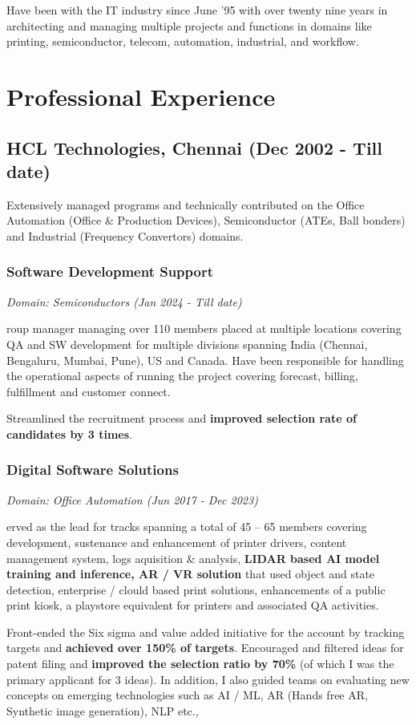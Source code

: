 \documentclass[a4paper,12pt]{article}
\newcommand\cvsubsection[3]{\subsection*{#1 \quad \small{(#2 - #3)}}}
\newcommand\cvprojectentry[5]{
  \subsubsection*{#1}
  
  \vspace{-7pt}
  
  \it{Domain: #2}\normalfont{} \quad (#3 - #4)
  
}
\begin{document}
{
Have been with the IT industry since June '95 with over twenty nine years
in architecting and managing multiple projects and functions in
domains like printing, semiconductor, telecom, automation, industrial,
and workflow.

\section*{Professional Experience}
  
\cvsubsection{HCL Technologies, Chennai}{Dec 2002}{Till date}

Extensively managed programs and technically contributed on the Office
Automation (Office \& Production Devices), Semiconductor (ATEs, Ball
bonders) and Industrial (Frequency Convertors) domains.

\cvprojectentry{Software Development Support}{Semiconductors}{Jan 2024}{Till date}

Group manager managing over 110 members placed at multiple locations
covering QA and SW development for multiple divisions spanning India
(Chennai, Bengaluru, Mumbai, Pune), US and Canada. Have been
responsible for handling the operational aspects of running the
project covering forecast, billing, fulfillment and customer connect.

Streamlined the recruitment process and \textbf{improved selection rate of
candidates by 3 times}.

\cvprojectentry{Digital Software Solutions}{Office Automation}{Jun 2017}{Dec 2023}

Served as the lead for tracks spanning a total of 45 – 65 members
covering development, sustenance and enhancement of printer drivers,
content management system, logs aquisition \& analysis, \textbf{LIDAR
  based AI model training and inference, AR / VR solution} that used
object and state detection, enterprise / clould based print solutions,
enhancements of a public print kiosk, a playstore equivalent for
printers and associated QA activities.

Front-ended the Six sigma and value added initiative for the account
by tracking targets and \textbf{achieved over 150\% of
  targets}. Encouraged and filtered ideas for patent filing and
\textbf{improved the selection ratio by 70\%} (of which I was the
primary applicant for 3 ideas). In addition, I also guided teams on
evaluating new concepts on emerging technologies such as AI / ML, AR
(Hands free AR, Synthetic image generation), NLP etc.,


}
\end{document}
